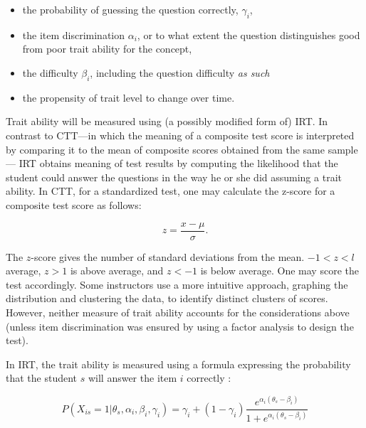 \begin{itemize}

  \item the probability of guessing the question correctly, $\gamma_i$,

  \item the item discrimination $\alpha_i$, or to what extent the question
        distinguishes good from poor trait ability for the concept,

  \item the difficulty $\beta_i$, including the question difficulty \emph{as
        such}

  \item the propensity of trait level to change over time.

  \end{itemize}

Trait ability will be measured using (a possibly modified form of) IRT.  In
contrast to CTT---in which the meaning of a composite test score is interpreted
by comparing it to the mean of composite scores obtained from the same
sample--- IRT obtains meaning of test results by computing the likelihood that
the student could answer the questions in the way he or she did assuming a
trait ability.  In CTT, for a standardized test, one may calculate the z-score
for a composite test score as follows:

\[
  z = \frac{x - \mu}{\sigma}.
\]

The $z$-score gives the number of standard deviations from the mean.  $-1 < z <
l$ average, $z > 1$ is above average, and $z < -1$ is below average.  One may
score the test accordingly.  Some instructors use a more intuitive approach,
graphing the distribution and clustering the data, to identify distinct
clusters of scores.  However, neither measure of trait ability accounts for the
considerations above (unless item discrimination was ensured by using a factor
analysis to design the test). 

In IRT, the trait ability is measured using a formula expressing the
probability that the student $s$ will answer the item $i$ correctly
\cite{embretson2000}: 

\[
 P(X_{is}=1 | \theta_s, \alpha_i, \beta_i, \gamma_i) = 
 \gamma_i + (1-\gamma_i) 
 \frac{    e^{\alpha_{i}(\theta_{s} - \beta_{i})}}
      {1 + e^{\alpha_{i}(\theta_{s} - \beta_{i})}}
\]

